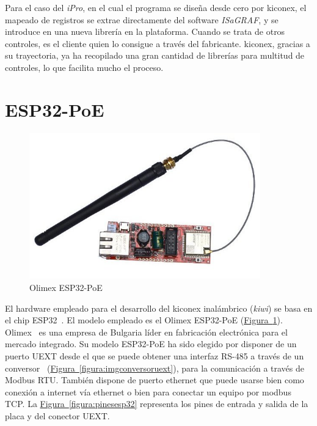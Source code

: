 Para el caso del \textit{iPro}, en el cual el programa se diseña desde cero por kiconex, el mapeado de registros se extrae directamente del software \textit{ISaGRAF}, y se introduce en una nueva librería en la plataforma. Cuando se trata de otros controles, es el cliente quien lo consigue a través del fabricante. kiconex, gracias a su trayectoria, ya ha recopilado una gran cantidad de librerías para multitud de controles, lo que facilita mucho el proceso.


\section{ESP32-PoE}
\label{sec:esp32poe}

\begin{figure}[H]
  \centering
  \includegraphics[width=10cm, keepaspectratio]{img/ESP32-POE}
  \caption{Olimex ESP32-PoE}
  \label{figura:imgesp32}
\end{figure}

El hardware empleado para el desarrollo del kiconex inalámbrico (\textit{kiwi}) se basa en el chip ESP32~\cite{esp32Espressif}. El modelo empleado es el Olimex ESP32-PoE (\hyperref[figura:imgesp32]{Figura~\ref{figura:imgesp32}}). Olimex~\cite{olimexEsp32product} es una empresa de Bulgaria líder en fabricación electrónica para el mercado integrado. Su modelo ESP32-PoE ha sido elegido por disponer de un puerto UEXT desde el que se puede obtener una interfaz RS-485 a través de un conversor~\cite{conversorUextProduct} (\hyperref[figura:imgconversoruext]{Figura~\ref{figura:imgconversoruext}}), para la comunicación a través de Modbus RTU. También dispone de puerto ethernet que puede usarse bien como conexión a internet vía ethernet o bien para conectar un equipo por modbus TCP. La \hyperref[figura:pinesesp32]{Figura~\ref{figura:pinesesp32}} representa los pines de entrada y salida de la placa y del conector UEXT.

